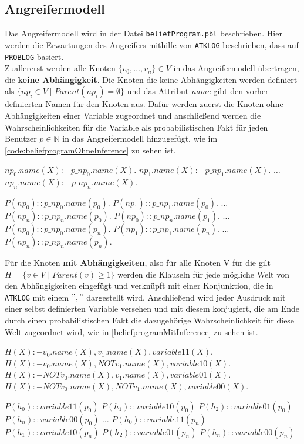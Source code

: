 \documentclass[german,version-2020-11]{uzl-thesis}
\begin{document}
\subsection{Angreifermodell}
Das Angreifermodell wird in der Datei \texttt{beliefProgram.pbl} beschrieben. Hier werden die Erwartungen des Angreifers mithilfe von \texttt{ATKLOG} beschrieben, dass auf \texttt{PROBLOG} basiert. \\ 
Zuallererst werden alle Knoten $\{v_0, \dots ,v_n\} \in V$ in das Angreifermodell übertragen, die \textbf{keine Abhängigkeit}. Die Knoten die keine Abhängigkeiten werden definiert als $\{np_i \in V \mid Parent(np_i) = \emptyset\}$ und das Attribut \textit{name} gibt den vorher definierten  Namen für den Knoten aus. Dafür werden zuerst die Knoten ohne Abhängigkeiten einer Variable zugeordnet und anschließend werden die Wahrscheinlichkeiten für die Variable als probabilistischen Fakt für jeden Benutzer $p \in \mathbb{N}$ in das Angreifermodell hinzugefügt, wie im \autoref{code:beliefprogramOhneInference} zu sehen ist.
\begin{Pseudocode} [caption={\texttt{beliefProgram.pbl} für Knoten ohne Abhängigkeiten}, label={code:beliefprogramOhneInference}]
$np_0.name(X) :- p\_np_0.name(X).$ 
$np_1.name(X) :- p\_np_1.name(X).$ 
$\dots$
$np_n.name(X) :- p\_np_n.name(X).$

$P(np_0) ::  p\_np_0.name(p_0).$ 
$P(np_1) ::  p\_np_1.name(p_0).$ 
$\dots$
$P(np_n) ::  p\_np_n.name(p_0).$ 
$P(np_0) ::  p\_np_n.name(p_1).$ 
$\dots$
$P(np_0) ::  p\_np_0.name(p_n).$ 
$P(np_1) ::  p\_np_1.name(p_n).$ 
$\dots$
$P(np_n) ::  p\_np_n.name(p_n).$ 
\end{Pseudocode}
Für die Knoten \textbf{mit Abhängigkeiten}, also für alle Knoten V für die gilt $H=\{v \in V \mid Parent(v) \geq 1 \}$ werden die Klauseln für jede mögliche Welt von den Abhängigkeiten eingefügt und verknüpft mit einer Konjunktion, die in \texttt{ATKLOG} mit einem $","$ dargestellt wird. Anschließend wird jeder Ausdruck mit einer selbst definierten Variable versehen und mit diesem konjugiert, die am Ende durch einen probabilistischen Fakt die dazugehörige Wahrscheinlichkeit für diese Welt zugeordnet wird, wie in \autoref{beliefprogramMitInference} zu sehen ist.
\begin{Pseudocode}[caption={\texttt{beliefProgram.pbl} für Knoten mit Abhängigkeiten}, label={code:beliefprogramMitInference}]
$H(X) :- v_0.name(X) , v_1.name(X), variable11(X).$
$H(X) :- v_0.name(X) , NOT v_1.name(X), variable10(X).$
$H(X) :- NOT v_0.name(X) , v_1.name(X), variable01(X).$
$H(X) :- NOT v_0.name(X) , NOT v_1.name(X), variable00(X).$

$P(h_0) :: variable11(p_0)$
$P(h_1) :: variable10(p_0)$
$P(h_2) :: variable01(p_0)$
$P(h_n) :: variable00(p_0)$
$\dots$
$P(h_0) :: variable11(p_n)$
$P(h_1) :: variable10(p_n)$
$P(h_2) :: variable01(p_n)$
$P(h_n) :: variable00(p_n)$
\end{Pseudocode} 
\end{document}
